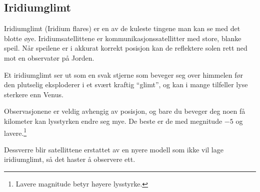 \documentclass[../SommerstjernerA4.tex]{subfiles}
\begin{document}
\subsection{Iridiumglimt}
Iridiumglimt (Iridium flares) er en av de kuleste tingene man kan se med det blotte øye. Iridiumsatellittene er kommunikasjonssatellitter med store, blanke speil. Når speilene er i akkurat korrekt posisjon kan de reflektere solen rett ned mot en observatør på Jorden.

Et iridiumglimt ser ut som en svak stjerne som beveger seg over himmelen før den plutselig eksploderer i et svært kraftig ``glimt'', og kan i mange tilfeller lyse sterkere enn Venus.

Observasjonene er veldig avhengig av posisjon, og bare du beveger deg noen få kilometer kan lysstyrken endre seg mye. De beste er de med megnitude $-5$ og lavere.\footnote{Lavere magnitude betyr høyere lysstyrke.}

Dessverre blir satellittene erstattet av en nyere modell som ikke vil lage iridiumglimt, så det haster å observere ett.
\end{document}
